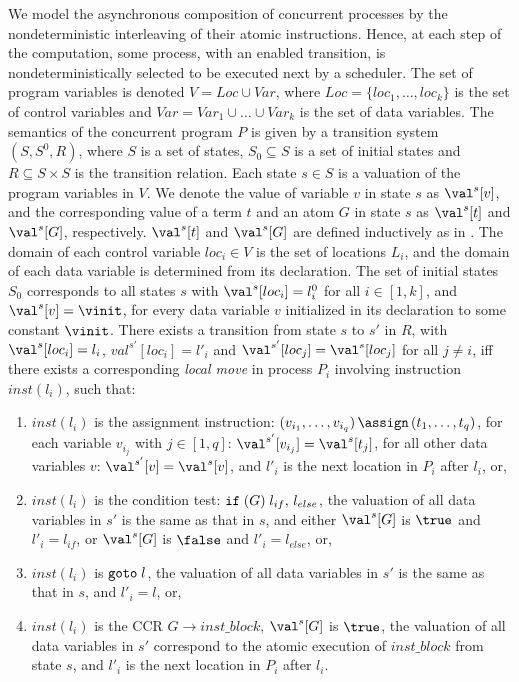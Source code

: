 We model the asynchronous composition of concurrent processes by the
nondeterministic interleaving of their atomic instructions. Hence, at
each step of the computation, some process, with an enabled
transition, is nondeterministically selected to be executed next by a
scheduler. The set of program variables is denoted $V = Loc \cup Var$,
where $Loc = \{loc_1, \ldots, loc_k\}$ is the set of control variables
and $Var = Var_1 \cup \ldots \cup Var_k$ is the set of data variables.
The semantics of the concurrent program $P$ is given by a transition
system $(S, S^0, R)$, where $S$ is a set of states, $S_0 \subseteq S$ is
a set of initial states and $R \subseteq S \times S$ is the transition relation. Each state $s
\in S$ is a valuation of the program variables in $V$. We denote
the value of variable $v$ in state $s$ as $\val^s[v]$, and the
corresponding value of a term $t$ and an atom $G$ in state $s$ as
$\val^s[t]$ and $\val^s[G]$, respectively. $\val^s[t]$ and $\val^s[G]$
are defined inductively as in . The domain of each
control variable $loc_i \in V$ is the set of locations $L_i$, and the
domain of each data variable is determined from its declaration.
The set of initial states $S_0$ corresponds to all states $s$
with $\val^s[loc_i] = l_i^0$ for all $i \in [1,k]$, and $\val^s[v] =
\vinit$, for every data variable $v$ initialized in its declaration
to some constant $\vinit$.  There exists a transition 
from state $s$ to $s'$ in $R$, with $\val^s[loc_i] =
l_i$, $val^{s'}[loc_i] = l'_i$ and $\val^{s'}[loc_j] = \val^s[loc_j]$
for all $j \neq i$, iff there exists a corresponding {\em local move} in
process $P_i$ involving instruction $inst(l_i)$, such that:
\begin{enumerate}
\item $inst(l_i)$ is the
assignment instruction: $(v_{i_1}, \ldots, v_{i_q}) \, {\bf \assign}
\, (t_1,\ldots, t_q)$, for each variable $v_{i_j}$ with $j \in [1,q]$: 
$\val^{s'}[v_{i_j}] = \val^s[t_j]$, for all other data variables $v$:
$\val^{s'}[v] = \val^s[v]$, and $l'_i$ is the next location in $P_i$
after $l_i$, or, 
\item $inst(l_i)$ is the condition test: ${\tt if} \;
(G) \; l_{if},\, l_{else}$, the valuation of all data variables in
$s'$ is the same as that in $s$, and either $\val^s[G]$ is $\true$ and
$l'_i = l_{if}$, or $\val^s[G]$ is $\false$ and $l'_i = l_{else}$, or,
\item  $inst(l_i)$ is ${\tt goto} \; l$,  the valuation of all data
variables in $s'$ is the same as that in $s$, and $l'_i = l$, or, 
\item $inst(l_i)$ is the CCR $G \to inst\_block$, $\val^s[G]$ is $\true$,
the valuation of all data variables in $s'$ correspond to the atomic
execution of $inst\_block$ from state $s$, and $l'_i$ is the next
location in $P_i$ after $l_i$.  
\end{enumerate}

